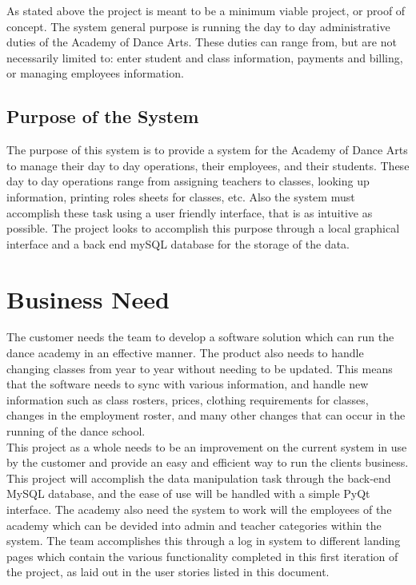 As stated above the project is meant to be a minimum viable project, or proof of concept. The system general purpose is running the day to day administrative duties of the Academy of Dance Arts. These duties can range from, but are not necessarily limited to: enter student and class information, payments and billing, or managing employees information. 

\subsection{Purpose of the System}
The purpose of this system is to provide a system for the Academy of Dance Arts to manage their day to day operations, their employees, and their students. These day to day operations range from assigning teachers to classes, looking up information, printing roles sheets for classes, etc.  Also the system must accomplish these task using a user friendly interface, that is as intuitive as possible. The project looks to accomplish this purpose through a local graphical interface and a back end mySQL database for the storage of the data.


\section{Business Need}
The customer needs the team to develop a software solution which can run the dance academy in an effective manner. The product also needs to handle changing classes from year to year without needing to be updated. This means that the software needs to sync with various information, and handle new information such as class rosters, prices, clothing requirements for classes, changes in the employment roster, and many other changes that can occur in the running of the dance school.\\
This project as a whole needs to be an improvement on the current system in use by the customer and provide an easy and efficient way to run the clients business. This project will accomplish the data manipulation task through the back-end MySQL database, and the ease of use will be handled with a simple PyQt interface.
The academy also need the system to work will the employees of the academy which can be devided into admin and teacher categories within the system. The team accomplishes this through a log in system to different landing pages which contain the various functionality completed in this first iteration of the project, as laid out in the user stories listed in this document.
   

